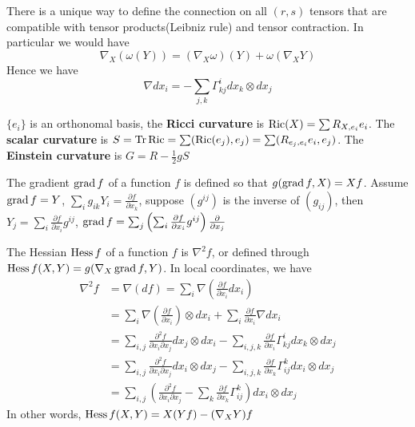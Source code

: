 \documentclass[main]{subfiles}
\begin{document}
\begin{definition}
There is a unique way to define the connection on all $(r,s)$ tensors that are compatible with tensor products(Leibniz rule) and tensor contraction. In particular we would have
\[\nabla_X(\omega(Y))=(\nabla_X\omega)(Y)+\omega(\nabla_XY)\]
Hence we have
\[\nabla dx_i=-\sum_{j,k}\Gamma_{kj}^idx_k\otimes dx_j\]
\end{definition}

\begin{definition}
$\{e_i\}$ is an orthonomal basis, the \textbf{Ricci curvature} is $\operatorname{Ric}(X)=\sum R_{X,e_i}e_i$. The \textbf{scalar curvature} is $S=\operatorname{Tr}\operatorname{Ric}=\sum(\operatorname{Ric}(e_j),e_j)=\sum(R_{e_j,e_i}e_i,e_j)$. The \textbf{Einstein curvature} is $G=R-\frac{1}{2}gS$
\end{definition}

\begin{definition}
The gradient $\operatorname{grad} f$ of a function $f$ is defined so that $g(\operatorname{grad} f, X)=Xf$. Assume $\operatorname{grad} f=Y$, $\sum_ig_{ik}Y_i=\frac{\partial f}{\partial x_k}$, suppose $(g^{ij})$ is the inverse of $(g_{ij})$, then $Y_j=\sum_i\frac{\partial f}{\partial x_i}g^{ij}$, $\operatorname{grad} f=\sum_j\left(\sum_i\frac{\partial f}{\partial x_i}g^{ij}\right)\frac{\partial}{\partial x_j}$
\end{definition}

\begin{definition}
The Hessian $\operatorname{Hess} f$ of a function $f$ is $\nabla^2 f$, or defined through $\operatorname{Hess} f(X,Y)=g(\nabla_X\operatorname{grad} f,Y)$. In local coordinates, we have
\begin{align*}
\nabla^2 f&=\nabla(df)=\sum_i\nabla\left(\frac{\partial f}{\partial x_i}dx_i\right)\\
&=\sum_i\nabla\left(\frac{\partial f}{\partial x_i}\right)\otimes dx_i+\sum_i\frac{\partial f}{\partial x_i}\nabla dx_i\\
&=\sum_{i,j}\frac{\partial^2f}{\partial x_i\partial x_j}dx_j\otimes dx_i-\sum_{i,j,k}\frac{\partial f}{\partial x_i}\Gamma_{kj}^idx_k\otimes dx_j\\
&=\sum_{i,j}\frac{\partial^2f}{\partial x_i\partial x_j}dx_i\otimes dx_j-\sum_{i,j,k}\frac{\partial f}{\partial x_k}\Gamma_{ij}^kdx_i\otimes dx_j\\
&=\sum_{i,j}\left(\frac{\partial^2f}{\partial x_i\partial x_j}-\sum_{k}\frac{\partial f}{\partial x_k}\Gamma_{ij}^k\right)dx_i\otimes dx_j
\end{align*}
In other words, $\operatorname{Hess} f(X,Y)=X(Yf)-(\nabla_XY)f$
\end{definition}
\end{document}
